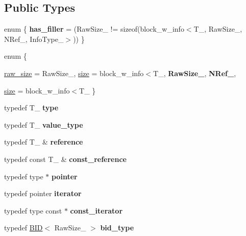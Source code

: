\subsection*{Public Types}
\begin{CompactItemize}
\item 
enum \{ \textbf{has\_\-filler} =  (RawSize\_\- != sizeof(block\_\-w\_\-info$<$T\_\-, RawSize\_\-, NRef\_\-, InfoType\_\-$>$))
 \}
\item 
enum \{ \par
\hyperlink{group__mnglayer_gg43854e49708cf32d97e65d727593833c53f1c9c4e116e026d8096110c42f27ea}{raw\_\-size} =  RawSize\_\-, 
\hyperlink{group__mnglayer_gg43854e49708cf32d97e65d727593833c8e272a078e257c8700b765dc85bf53a2}{size} =  block\_\-w\_\-info$<$T\_\-, 
\textbf{RawSize\_\-}, 
\textbf{NRef\_\-}, 
\par
\hyperlink{group__mnglayer_gg43854e49708cf32d97e65d727593833c8e272a078e257c8700b765dc85bf53a2}{size} =  block\_\-w\_\-info$<$T\_\-
 \}
\item 
\hypertarget{classtyped__block_743585b8b2228c06af23f996e03c0110}{
typedef T\_\- \textbf{type}}
\label{classtyped__block_743585b8b2228c06af23f996e03c0110}

\item 
\hypertarget{group__mnglayer_g7f42e0c3e742cf3733e0d5592d54ab58}{
typedef T\_\- \textbf{value\_\-type}}
\label{group__mnglayer_g7f42e0c3e742cf3733e0d5592d54ab58}

\item 
\hypertarget{group__mnglayer_g521aff2a3700245029372deb0be2b287}{
typedef T\_\- \& \textbf{reference}}
\label{group__mnglayer_g521aff2a3700245029372deb0be2b287}

\item 
\hypertarget{group__mnglayer_g34e897ac51826913281aaf4b10465659}{
typedef const T\_\- \& \textbf{const\_\-reference}}
\label{group__mnglayer_g34e897ac51826913281aaf4b10465659}

\item 
\hypertarget{group__mnglayer_gbc7c8a98ff603c8087eb1fd8974ea270}{
typedef type $\ast$ \textbf{pointer}}
\label{group__mnglayer_gbc7c8a98ff603c8087eb1fd8974ea270}

\item 
\hypertarget{group__mnglayer_g75bd38227d7b7e5b772911ab87d0e7bc}{
typedef pointer \textbf{iterator}}
\label{group__mnglayer_g75bd38227d7b7e5b772911ab87d0e7bc}

\item 
\hypertarget{group__mnglayer_g7cbb990a4e44249df63a9e878aec6338}{
typedef type const $\ast$ \textbf{const\_\-iterator}}
\label{group__mnglayer_g7cbb990a4e44249df63a9e878aec6338}

\item 
\hypertarget{group__mnglayer_gae0703379ce10cdd001a53c8983bbdf5}{
typedef \hyperlink{structBID}{BID}$<$ RawSize\_\- $>$ \textbf{bid\_\-type}}
\label{group__mnglayer_gae0703379ce10cdd001a53c8983bbdf5}

\end{CompactItemize}
